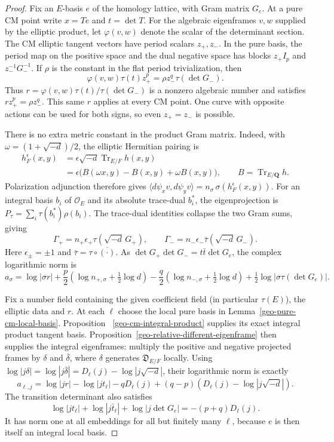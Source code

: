 \begin{proof}
Fix an $E$-basis $e$ of the homology lattice, with Gram matrix $G_e$.
At a pure CM point write $x=Te$ and $t=\det T$.
For the algebraic eigenframes $v,w$ supplied by the elliptic product,
let $\varphi(v,w)$ denote the scalar of the determinant section.
The CM elliptic tangent vectors have period scalars $z_+,z_-$.
In the pure basis, the period map on the positive space and the
dual negative space has blocks
$z_+I_p$ and $z_-^{-1}G_-^{-1}$.
If $\rho$ is the constant in the flat period trivialization, then
\[
 \varphi(v,w)\tau(t)z_+^p=\rho z_-^q\tau(\det G_-).
\]
Thus
$r=\varphi(v,w)\tau(t)/\tau(\det G_-)$ is a nonzero algebraic
number and satisfies $rz_+^p=\rho z_-^q$.
This same $r$ applies at every CM point. One curve with opposite
actions can be used for both signs, so even $z_+=z_-$ is possible.

There is no extra metric constant in the product Gram matrix.
Indeed, with $\omega=(1+\sqrt{-d})/2$, the elliptic Hermitian
pairing is
\[
 \begin{aligned}
 h_F^\epsilon(x,y)
 &=\epsilon\sqrt{-d}\operatorname{Tr}_{E/F}h(x,y)\\
 &=\epsilon\bigl(B(\omega x,y)-B(x,y)+\omega B(x,y)\bigr),
 \qquad B=\operatorname{Tr}_{E/\mathbf Q}h.
 \end{aligned}
\]
Polarization adjunction therefore gives
$\langle d\psi_xv,d\psi_yv\rangle
=n_\sigma\,\sigma(h_F^\epsilon(x,y))$.
For an integral basis $b_i$ of $\mathcal O_E$ and its absolute
trace-dual $b_i^*$, the eigenprojection is
$P_\tau=\sum_i\tau(b_i^*)\rho(b_i)$.
The trace-dual identities collapse the two Gram sums, giving
\[
 \Gamma_+=n_+\epsilon_+\tau(\sqrt{-d}\,G_+),\qquad
 \Gamma_-=n_-\epsilon_-\bar\tau(\sqrt{-d}\,G_-).
\]
Here $\epsilon_\pm=\pm1$ and $\bar\tau=\tau\circ\overline{(\cdot)}$.
As
$\det G_+\det G_-=t\bar t\det G_e$, the complex logarithmic norm is
\[
 a_\sigma=\log|\sigma r|
 +\frac p2(\log n_{+,\sigma}+\tfrac12\log d)
 -\frac q2(\log n_{-,\sigma}+\tfrac12\log d)
 +\tfrac12\log|\sigma\tau(\det G_e)|.
\]

Fix a number field containing the given coefficient field
(in particular $\tau(E)$), the elliptic data and $r$.
At each $\ell$ choose the local pure basis in
Lemma~\ref{geo-pure-cm-local-basis}. Proposition
~\ref{geo-cm-integral-product} supplies its exact integral product
tangent basis. Proposition~\ref{geo-relative-different-eigenframe}
then supplies the integral eigenframes: multiply the positive
and negative projected frames by $\delta$ and $\bar\delta$,
where $\delta$ generates $\mathfrak D_{E/F}$ locally.
Using
$\log|j\delta|=\log|j\bar\delta|
=D_\ell(j)-\log|j\sqrt{-d}|$, their logarithmic norm is exactly
\[
 a_{\ell,j}
 =\log|jr|-\log|jt_\ell|-qD_\ell(j)
             +(q-p)(D_\ell(j)-\log|j\sqrt{-d}|).
\]
The transition determinant also satisfies
\[
 \log|jt_\ell|+\log|j\bar t_\ell|
 +\log|j\det G_e|=-(p+q)D_\ell(j).
\]
It has norm one at all embeddings for all but finitely many
$\ell$, because $e$ is then itself an integral local basis.


\end{proof}
